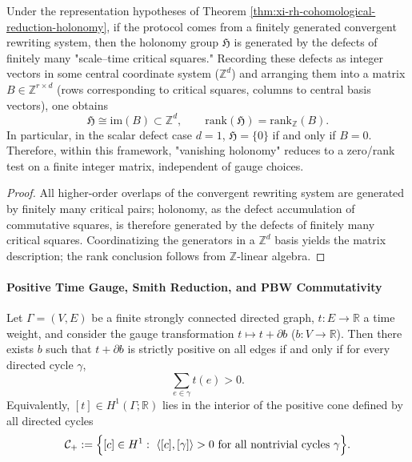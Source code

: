\begin{proposition}\label{prop:xi-rh-finite-curvature-matrix-criterion}
Under the representation hypotheses of Theorem \ref{thm:xi-rh-cohomological-reduction-holonomy}, if the protocol comes from a finitely generated convergent rewriting system, then the holonomy group \(\mathfrak H\) is generated by the defects of finitely many "scale--time critical squares."
Recording these defects as integer vectors in some central coordinate system (\(\mathbb Z^d\)) and arranging them into a matrix \(B\in\mathbb Z^{r\times d}\) (rows corresponding to critical squares, columns to central basis vectors), one obtains
\[
\mathfrak H\cong \mathrm{im}(B)\subset\mathbb Z^d,
\qquad
\mathrm{rank}(\mathfrak H)=\mathrm{rank}_{\mathbb Z}(B).
\]
In particular, in the scalar defect case \(d=1\), \(\mathfrak H=\{0\}\) if and only if \(B=0\).
Therefore, within this framework, "vanishing holonomy" reduces to a zero/rank test on a finite integer matrix, independent of gauge choices.
\end{proposition}

\begin{proof}
All higher-order overlaps of the convergent rewriting system are generated by finitely many critical pairs; holonomy, as the defect accumulation of commutative squares, is therefore generated by the defects of finitely many critical squares.
Coordinatizing the generators in a \(\mathbb Z^d\) basis yields the matrix description; the rank conclusion follows from \(\mathbb Z\)-linear algebra.
\end{proof}

\paragraph{Positive Time Gauge, Smith Reduction, and PBW Commutativity}

\begin{proposition}\label{prop:xi-positive-time-cone-criterion}
Let \(\Gamma=(V,E)\) be a finite strongly connected directed graph, \(t:E\to\mathbb R\) a time weight, and consider the gauge transformation \(t\mapsto t+\partial b\) (\(b:V\to\mathbb R\)).
Then there exists \(b\) such that \(t+\partial b\) is strictly positive on all edges if and only if for every directed cycle \(\gamma\),
\[
\sum_{e\in\gamma} t(e)>0.
\]
Equivalently, \([t]\in H^1(\Gamma;\mathbb R)\) lies in the interior of the positive cone defined by all directed cycles
\[
\mathcal C_+:=\Bigl\{[c]\in H^1:\ \langle[c],[\gamma]\rangle>0\ \text{for all nontrivial cycles }\gamma\Bigr\}.
\]
\end{proposition}

